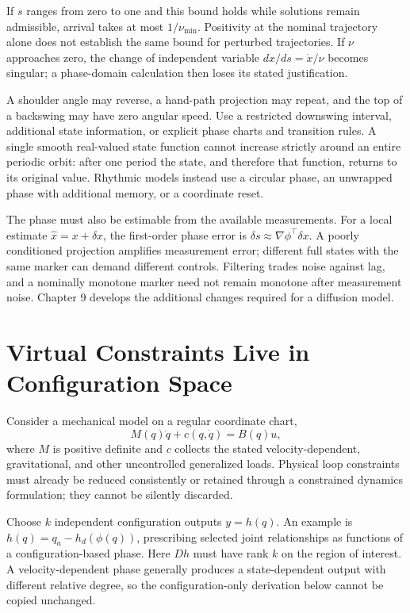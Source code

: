 \documentclass[12pt, openany]{book}
\theoremstyle{plain}
\begin{document}
If $s$ ranges from zero to one and this bound holds while solutions remain admissible, arrival takes at most $1/\nu_{\min}$. Positivity at the nominal trajectory alone does not establish the same bound for perturbed trajectories. If $\nu$ approaches zero, the change of independent variable $dx/ds=\dot x/\nu$ becomes singular; a phase-domain calculation then loses its stated justification.

A shoulder angle may reverse, a hand-path projection may repeat, and the top of a backswing may have zero angular speed. Use a restricted downswing interval, additional state information, or explicit phase charts and transition rules. A single smooth real-valued state function cannot increase strictly around an entire periodic orbit: after one period the state, and therefore that function, returns to its original value. Rhythmic models instead use a circular phase, an unwrapped phase with additional memory, or a coordinate reset.

The phase must also be estimable from the available measurements. For a local estimate $\hat x=x+\delta x$, the first-order phase error is $\delta s\approx\nabla\phi^\top\delta x$. A poorly conditioned projection amplifies measurement error; different full states with the same marker can demand different controls. Filtering trades noise against lag, and a nominally monotone marker need not remain monotone after measurement noise. Chapter 9 develops the additional changes required for a diffusion model.

\section{Virtual Constraints Live in Configuration Space}

Consider a mechanical model on a regular coordinate chart,
\begin{equation}
M(q)\ddot q+c(q,\dot q)=B(q)u ,
\end{equation}
where $M$ is positive definite and $c$ collects the stated velocity-dependent, gravitational, and other uncontrolled generalized loads. Physical loop constraints must already be reduced consistently or retained through a constrained dynamics formulation; they cannot be silently discarded.

Choose $k$ independent configuration outputs $y=h(q)$. An example is $h(q)=q_a-h_d(\phi(q))$, prescribing selected joint relationships as functions of a configuration-based phase. Here $Dh$ must have rank $k$ on the region of interest. A velocity-dependent phase generally produces a state-dependent output with different relative degree, so the configuration-only derivation below cannot be copied unchanged.
\end{document}
